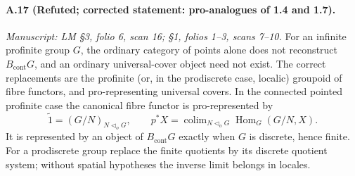 \paragraph{A.17 (Refuted; corrected statement: pro-analogues of 1.4 and 1.7).}
\textit{Manuscript: LM \S3, folio 6, scan 16; \S1, folios 1--3, scans 7--10.}
For an infinite profinite group $G$, the ordinary category of points alone does not reconstruct $B_{\mathrm{cont}}G$, and an ordinary universal-cover object need not exist. The correct replacements are the profinite (or, in the prodiscrete case, localic) groupoid of fibre functors, and pro-representing universal covers. In the connected pointed profinite case the canonical fibre functor is pro-represented by
\[
 \widetilde 1=(G/N)_{N\triangleleft_oG},\qquad
 p^*X=\mathop{\mathrm{colim}}_{N\triangleleft_oG}
                         \operatorname{Hom}_G(G/N,X).
                                                        \tag{A.17.1}
\]
It is represented by an object of $B_{\mathrm{cont}}G$ exactly when $G$ is discrete, hence finite. For a prodiscrete group replace the finite quotients by its discrete quotient system; without spatial hypotheses the inverse limit belongs in locales.
